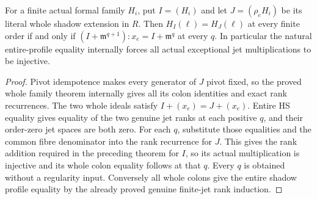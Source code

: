\begin{theorem}
\label{hir:actual-exceptional-entire-shadow-hs-colon-rigidity}
\leanok
For a finite actual formal family $H_i$, put $I=(H_i)$ and let
$J=(\rho_eH_i)$ be its literal whole shadow extension in $R$.
Then $H_I(\ell)=H_J(\ell)$ at every finite order if and only if
$(I+\mathfrak m^{q+1}):x_e=I+\mathfrak m^q$ at every $q$.
In particular the natural entire-profile equality internally forces
all actual exceptional jet multiplications to be injective.
\end{theorem}
\begin{proof}
Pivot idempotence makes every generator of $J$ pivot fixed, so the
proved whole family theorem internally gives all its colon identities
and exact rank recurrences. The two whole ideals satisfy
$I+(x_e)=J+(x_e)$. Entire HS equality gives equality of the two genuine
jet ranks at each positive $q$, and their order-zero jet spaces are
both zero. For each $q$, substitute those equalities and the common
fibre denominator into the rank recurrence for $J$. This gives the
rank addition required in the preceding theorem for $I$, so its
actual multiplication is injective and its whole colon equality
follows at that $q$. Every $q$ is obtained without a regularity input.
Conversely all whole colons give the entire shadow profile equality
by the already proved genuine finite-jet rank induction.
\end{proof}

